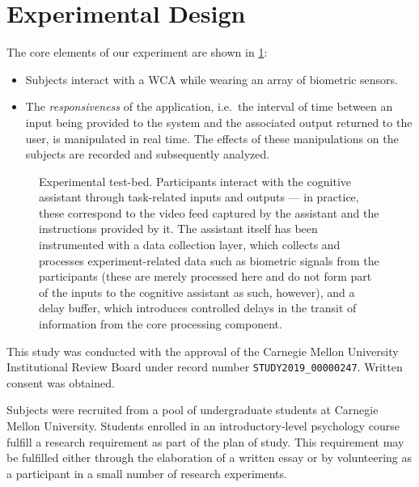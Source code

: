 \documentclass[10pt,letterpaper]{article}
\providecommand{\DIFaddtex}[1]{#1} %
\providecommand{\DIFdeltex}[1]{} %
\providecommand{\DIFaddbegin}{\protect\color{blue}} %
\providecommand{\DIFaddend}{\protect\color{black}} %
\providecommand{\DIFdelbegin}{\protect\color{red}} %
\providecommand{\DIFdelend}{\protect\color{black}} %
\providecommand{\DIFadd}[1]{\texorpdfstring{\DIFaddtex{#1}}{#1}} %
\providecommand{\DIFdel}[1]{\texorpdfstring{\DIFdeltex{#1}}{}} %
\newcommand{\DIFscaledelfig}{0.5}
\newlength{\DIFdelgraphicswidth} %
\newlength{\DIFdelgraphicsheight} %
\newcommand{\DIFaddincludegraphics}[2][]{{\color{blue}\fbox{\DIFOincludegraphics[#1]{#2}}}} %
\newcommand{\DIFdelincludegraphics}[2][]{%
\sbox{\DIFdelgraphicsbox}{\DIFOincludegraphics[#1]{#2}}%
\settoboxwidth{\DIFdelgraphicswidth}{\DIFdelgraphicsbox} %
\settoboxtotalheight{\DIFdelgraphicsheight}{\DIFdelgraphicsbox} %
\scalebox{\DIFscaledelfig}{%
\parbox[b]{\DIFdelgraphicswidth}{\usebox{\DIFdelgraphicsbox}\\[-\baselineskip] \rule{\DIFdelgraphicswidth}{0em}}\llap{\resizebox{\DIFdelgraphicswidth}{\DIFdelgraphicsheight}{%
\setlength{\unitlength}{\DIFdelgraphicswidth}%
\begin{picture}(1,1)%
\thicklines\linethickness{2pt} %
{\color[rgb]{1,0,0}\put(0,0){\framebox(1,1){}}}%
{\color[rgb]{1,0,0}\put(0,0){\line( 1,1){1}}}%
{\color[rgb]{1,0,0}\put(0,1){\line(1,-1){1}}}%
\end{picture}%
}\hspace*{3pt}}} %
} %
\DeclareRobustCommand{\DIFaddbegin}{\DIFOaddbegin \let\includegraphics\DIFaddincludegraphics} %
\DeclareRobustCommand{\DIFaddend}{\DIFOaddend \let\includegraphics\DIFOincludegraphics} %
\DeclareRobustCommand{\DIFdelbegin}{\DIFOdelbegin \let\includegraphics\DIFdelincludegraphics} %
\DeclareRobustCommand{\DIFdelend}{\DIFOaddend \let\includegraphics\DIFOincludegraphics} %
\begin{document}
\section{Experimental Design}\label{sec:experimentaldesign}

The core elements of our experiment are shown in \cref{fig:experimentaltestbed}:
\begin{itemize}
    \item Subjects interact with a WCA while wearing an array of biometric sensors.
    \item The \emph{responsiveness} of the application, i.e.\ the interval of time between an input being provided to the system and the associated output returned to the user, is manipulated in real time. 
    The effects of these manipulations on the subjects are recorded and subsequently analyzed.    
\end{itemize}

\begin{figure}[h]
  \centering
  \caption{Experimental test-bed.
  Participants interact with the cognitive assistant through task-related inputs and outputs --- in practice, these correspond to the video feed captured by the assistant and the instructions provided by it.
  The assistant itself has been instrumented with a data collection layer, which collects and processes experiment-related data such as biometric signals from the participants (these are merely processed here and do not form part of the inputs to the cognitive assistant as such, however), and a delay buffer, which introduces controlled delays in the transit of information from the core processing component.}%
  \label{fig:experimentaltestbed}
\end{figure}

\DIFaddbegin%
This study was conducted with the approval of the Carnegie Mellon University Institutional Review Board \DIFadd{under record number \texttt{STUDY2019\_00000247}. 
Written consent was obtained.}

\DIFaddend Subjects were recruited from a pool of undergraduate students \DIFdelbegin \DIFdel{fulfilling a course requirement }\DIFdelend at Carnegie Mellon University.
\DIFaddbegin \DIFadd{Students enrolled in an introductory-level psychology course fulfill a research requirement as part of the plan of study.
This requirement may be fulfilled either through the elaboration of a written essay or by volunteering as a participant in a small number of research experiments.
}
\end{document}

